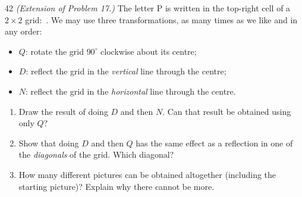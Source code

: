 \begin{probbox}{42}{}
\textit{(Extension of Problem 17.)} The letter P is written in the top-right cell of a $2\times 2$ grid:
\,. We may use three transformations, as many times as we like and in any order:
\begin{itemize}[leftmargin=1.4em,itemsep=1pt]
\item $Q$: rotate the grid $90^\circ$ clockwise about its centre;
\item $D$: reflect the grid in the \emph{vertical} line through the centre;
\item $N$: reflect the grid in the \emph{horizontal} line through the centre.
\end{itemize}
\begin{enumerate}[label=\alph*),leftmargin=1.6em,itemsep=1pt]
\item Draw the result of doing $D$ and then $N$. Can that result be obtained using only $Q$?
\item Show that doing $D$ and then $Q$ has the same effect as a reflection in one of the \emph{diagonals} of the
grid. Which diagonal?
\item How many different pictures can be obtained altogether (including the starting picture)? Explain why there
cannot be more.
\end{enumerate}
\end{probbox}
